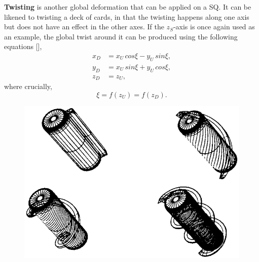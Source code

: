 \textbf{Twisting} is another global deformation that can be applied on a \gls{SQ}. It can be likened to twisting a deck of cards, in that the twisting happens along one axis but does not have an effect in the other axes. If the $z_S$-axis is once again used as an example, the global twist around it can be produced using the following equations [\citeauthor{Barr1984}],
\begin{align}
x_D &= x_U\,cos\xi - y_U\,sin\xi, \\
y_D &= x_U\,sin\xi + y_U\,cos\xi, \\
z_D &= z_U,
\end{align}
where crucially,
\begin{equation}
\xi = f(z_U) = f(z_D).
\end{equation}
\begin{figure}
	\centering
	\begin{minipage}[h]{0.4\textwidth}
		\includegraphics[width=1\textwidth]{import/SQ_twisted}
		\label{fig:SQ_twist}
	\end{minipage}
	\hspace{1cm}
	\begin{minipage}[h]{0.4\textwidth}

\end{minipage}
\end{figure}
